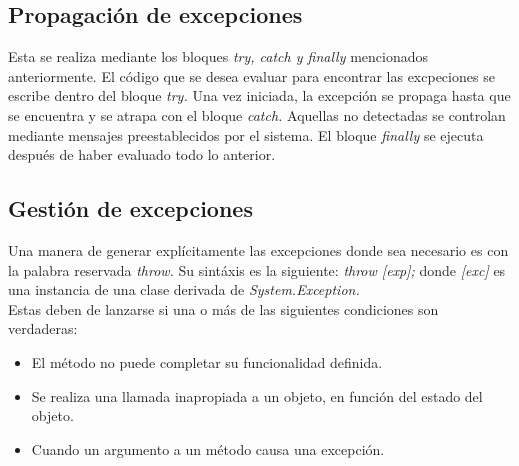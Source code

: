 \documentclass[letterpaper, 12pt]{article}
\begin{document}
\begin{justify}
        \subsection{Propagación de excepciones}
        Esta se realiza mediante los bloques \emph{try, catch y finally} mencionados anteriormente. El código que se desea evaluar para encontrar las excpeciones se escribe dentro del bloque \emph{try.}
        Una vez iniciada, la excepción se propaga hasta que se encuentra y se atrapa con el bloque \emph{catch.} Aquellas no detectadas se controlan mediante mensajes preestablecidos por el sistema. El
        bloque \emph{finally} se ejecuta después de haber evaluado todo lo anterior.

        \subsection{Gestión de excepciones}
        Una manera de generar explícitamente las excepciones donde sea necesario es con la palabra reservada \emph{throw.} Su sintáxis es la siguiente: \emph{throw [exp];} donde \emph{[exc]} es una instancia
        de una clase derivada de \emph{System.Exception.}
        \newline
        \\
        Estas deben de lanzarse si una o más de las siguientes condiciones son verdaderas:
        \begin{itemize}
            \item El método no puede completar su funcionalidad definida.
            \item Se realiza una llamada inapropiada a un objeto, en función del estado del objeto.
            \item Cuando un argumento a un método causa una excepción.
        \end{itemize}


\end{justify}
\end{document}
